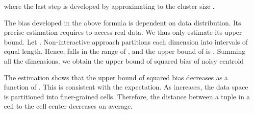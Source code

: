where the last step is developed by approximating  to the cluster size .

The bias developed in the above formula is dependent on data distribution. Its precise estimation requires to access real data. We thus only estimate its upper bound. Let . Non-interactive approach partitions each dimension into  intervals of equal length. Hence,  falls in the range of , and the upper bound of  is . Summing all the  dimensions, we obtain the upper bound of squared bias of noisy centroid



The estimation shows that the upper bound of squared bias decreases as a function of . This is consistent with the expectation. As  increases, the data space is partitioned into finer-grained cells. Therefore, the distance between a tuple in a cell to the cell center decreases on average.


